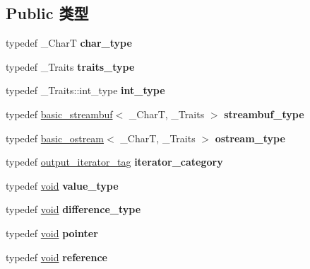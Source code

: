 \subsection*{Public 类型}
\begin{DoxyCompactItemize}
\item 
\mbox{\label{classostreambuf__iterator_ad76113014230bcd215d884655d35b16d}} 
typedef \+\_\+\+CharT {\bfseries char\+\_\+type}
\item 
\mbox{\label{classostreambuf__iterator_a0575783e20b5bbad89d08756f7781d47}} 
typedef \+\_\+\+Traits {\bfseries traits\+\_\+type}
\item 
\mbox{\label{classostreambuf__iterator_aeac3748c7550a3126deb1f89c9838475}} 
typedef \+\_\+\+Traits\+::int\+\_\+type {\bfseries int\+\_\+type}
\item 
\mbox{\label{classostreambuf__iterator_a1481c814bc7bc103ad70727423f976af}} 
typedef \hyperlink{classbasic__streambuf}{basic\+\_\+streambuf}$<$ \+\_\+\+CharT, \+\_\+\+Traits $>$ {\bfseries streambuf\+\_\+type}
\item 
\mbox{\label{classostreambuf__iterator_a706f5c1fb591378691ee38570816e0cf}} 
typedef \hyperlink{classbasic__ostream}{basic\+\_\+ostream}$<$ \+\_\+\+CharT, \+\_\+\+Traits $>$ {\bfseries ostream\+\_\+type}
\item 
\mbox{\label{classostreambuf__iterator_ad35fb8273fae84ca2b1f307b6a3689b6}} 
typedef \hyperlink{structoutput__iterator__tag}{output\+\_\+iterator\+\_\+tag} {\bfseries iterator\+\_\+category}
\item 
\mbox{\label{classostreambuf__iterator_a6157ece0137125975312f1057f2c2356}} 
typedef \hyperlink{interfacevoid}{void} {\bfseries value\+\_\+type}
\item 
\mbox{\label{classostreambuf__iterator_ac9f264e888fc31d17e2ee7f673fd7e27}} 
typedef \hyperlink{interfacevoid}{void} {\bfseries difference\+\_\+type}
\item 
\mbox{\label{classostreambuf__iterator_ac5e17d875f56a426eb9a934aea881893}} 
typedef \hyperlink{interfacevoid}{void} {\bfseries pointer}
\item 
\mbox{\label{classostreambuf__iterator_a66bf7a96fcbd4f31dfc45242def2fc06}} 
typedef \hyperlink{interfacevoid}{void} {\bfseries reference}
\end{DoxyCompactItemize}
